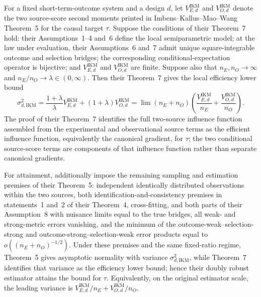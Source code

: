 For a fixed short-term-outcome system and a design \(d\), let \(V_{E,d}^{\mathrm{IKM}}\) and \(V_{O,d}^{\mathrm{IKM}}\) denote the two source-score second moments printed in Imbens--Kallus--Mao--Wang Theorem~5 for the causal target \(\tau\). Suppose the conditions of their Theorem~7 hold: their Assumptions~1--4 and~6 define the local semiparametric model; at the law under evaluation, their Assumptions~6 and~7 admit unique square-integrable outcome and selection bridges; the corresponding conditional-expectation operator is bijective; and \(V_{E,d}^{\mathrm{IKM}}\) and \(V_{O,d}^{\mathrm{IKM}}\) are finite. Suppose also that \(n_E,n_O\to\infty\) and \(n_E/n_O\to\lambda\in(0,\infty)\). Then their Theorem~7 gives the local efficiency lower bound
\[
 \sigma_{d,\mathrm{IKM}}^2
 =\frac{1+\lambda}{\lambda}V_{E,d}^{\mathrm{IKM}}
 +(1+\lambda)V_{O,d}^{\mathrm{IKM}}
 =\lim (n_E+n_O)\left(
 \frac{V_{E,d}^{\mathrm{IKM}}}{n_E}
 +\frac{V_{O,d}^{\mathrm{IKM}}}{n_O}
 \right).
\]
The proof of their Theorem~7 identifies the full two-source influence function assembled from the experimental and observational source terms as the efficient influence function, equivalently the canonical gradient, for \(\tau\); the two conditional source-score terms are components of that influence function rather than separate canonical gradients.

For attainment, additionally impose the remaining sampling and estimation premises of their Theorem~5: independent identically distributed observations within the two sources, both identification-and-consistency premises in statements~1 and~2 of their Theorem~4, cross-fitting, and both parts of their Assumption~8 with nuisance limits equal to the true bridges, all weak- and strong-metric errors vanishing, and the minimum of the outcome-weak--selection-strong and outcome-strong--selection-weak error products equal to \(o((n_E+n_O)^{-1/2})\). Under these premises and the same fixed-ratio regime, Theorem~5 gives asymptotic normality with variance \(\sigma_{d,\mathrm{IKM}}^2\), while Theorem~7 identifies that variance as the efficiency lower bound; hence their doubly robust estimator attains the bound for \(\tau\). Equivalently, on the original estimator scale, the leading variance is \(V_{E,d}^{\mathrm{IKM}}/n_E+V_{O,d}^{\mathrm{IKM}}/n_O\).